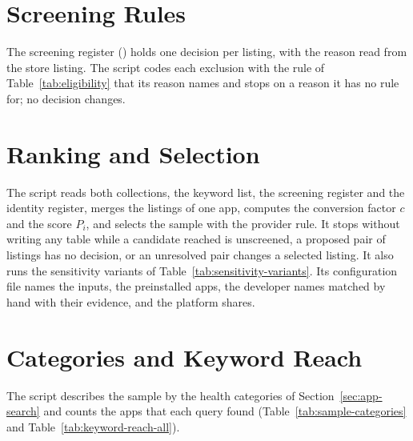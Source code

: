 

\section{Screening Rules}
The screening register () holds one decision per
listing, with the reason read from the store listing. The script codes each exclusion with the
rule of Table~\ref{tab:eligibility} that its reason names and stops on a reason it has no rule
for; no decision changes.



\section{Ranking and Selection}
The script reads both collections, the keyword list, the screening register and the identity
register, merges the listings of one app, computes the conversion factor $c$ and the score $P_i$,
and selects the sample with the provider rule. It stops without writing any table while a
candidate reached is unscreened, a proposed pair of listings has no decision, or an unresolved
pair changes a selected listing. It also runs the sensitivity variants of
Table~\ref{tab:sensitivity-variants}. Its configuration file names the inputs, the preinstalled
apps, the developer names matched by hand with their evidence, and the platform shares.



\section{Categories and Keyword Reach}
The script describes the sample by the health categories of Section~\ref{sec:app-search} and
counts the apps that each query found (Table~\ref{tab:sample-categories} and
Table~\ref{tab:keyword-reach-all}).


